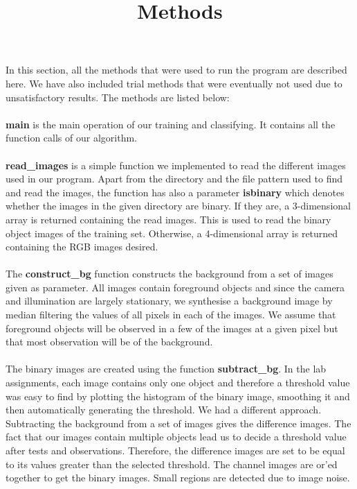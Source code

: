 \documentclass[11pt]{article}
\begin{document}
\title{Methods}\setlength{\droptitle}{-70pt}
\date{\vspace{-10ex}}
\maketitle
\paragraph{}
In this section, all the methods that were used to run the program are described here. We have also included trial methods that were eventually not used due to unsatisfactory results. The methods are listed below:
\paragraph{}
\textbf{main} is the main operation of our training and classifying. It contains all the function calls of our algorithm.
\paragraph{}
\textbf{read\_images} is a simple function we implemented to read the different images used in our program. Apart from the directory and the file pattern used to find and read the images, the function has also a parameter \textbf{isbinary} which denotes whether the images in the given directory are binary. If they are, a 3-dimensional array is returned containing the read images. This is used to read the binary object images of the training set.  Otherwise, a 4-dimensional array is returned containing the RGB images desired.

\paragraph{}
The \textbf{construct\_bg} function constructs the background from a set of images given as parameter. All images contain foreground objects and since the camera and illumination are largely stationary, we synthesise a background image by median filtering the values of all pixels in each of the images. We assume that foreground objects will be observed in a few of the images at a given pixel but that most observation will be of the background. 

\paragraph{}
The binary images are created using the function \textbf{subtract\_bg}. In the lab assignments, each image contains only one object and therefore a threshold value was easy to find by plotting the histogram of the binary image, smoothing it and then automatically generating the threshold. We had a different approach. Subtracting the background from a set of images gives the difference images. The fact that our images contain multiple objects lead us to decide a threshold value after tests and observations. Therefore, the difference images are set to be equal to its values greater than the selected threshold. 
The channel images are or’ed together to get the binary images. Small regions are detected due to image noise.
\end{document}
